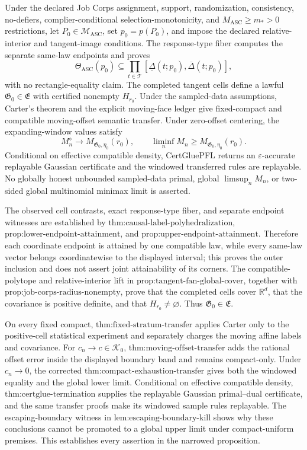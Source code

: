 Under the declared Job Corps assignment, support, randomization, consistency, no-defiers, complier-conditional selection-monotonicity, and \(M_{\mathrm{ASC}}\ge m_*>0\) restrictions, let \(P_0\in\mathcal M_{\mathrm{ASC}}\), set \(p_0=p(P_0)\), and impose the declared relative-interior and tangent-image conditions. The response-type fiber computes the separate same-law endpoints and proves
\[
 \Theta_{\mathrm{ASC}}(p_0)
 \subseteq\prod_{t\in\mathcal T}
 [\underline\Delta(t;p_0),\overline\Delta(t;p_0)],
\]
with no rectangle-equality claim. The completed tangent cells define a lawful \(\mathfrak G_0\in\mathfrak E\) with certified nonempty \(H_{r_0}\). Under the sampled-data assumptions, Carter's theorem and the explicit moving-face ledger give fixed-compact and compatible moving-offset semantic transfer. Under zero-offset centering, the expanding-window values satisfy
\[
 M_n^{\diamond}\to M_{\mathfrak G_0,\eta_0}(r_0),
 \qquad
 \liminf_nM_n\ge M_{\mathfrak G_0,\eta_0}(r_0).
\]
Conditional on effective compatible density, CertGluePFL returns an \(\varepsilon\)-accurate replayable Gaussian certificate and the windowed transferred rules are replayable. No globally honest unbounded sampled-data primal, global \(\limsup_nM_n\), or two-sided global multinomial minimax limit is asserted.

The observed cell contrasts, exact response-type fiber, and separate endpoint witnesses are established by \(\text{thm:causal-label-polyhedralization}\), \(\text{prop:lower-endpoint-attainment}\), and \(\text{prop:upper-endpoint-attainment}\). Therefore each coordinate endpoint is attained by one compatible law, while every same-law vector belongs coordinatewise to the displayed interval; this proves the outer inclusion and does not assert joint attainability of its corners. The compatible-polytope and relative-interior lift in \(\text{prop:tangent-fan-global-cover}\), together with \(\text{prop:job-corps-radius-nonempty}\), prove that the completed cells cover \(\mathbb R^d\), that the covariance is positive definite, and that \(H_{r_0}\ne\varnothing\). Thus \(\mathfrak G_0\in\mathfrak E\).

On every fixed compact, \(\text{thm:fixed-stratum-transfer}\) applies Carter only to the positive-cell statistical experiment and separately charges the moving affine labels and covariance. For \(c_n\to c\in\mathcal K_0\), \(\text{thm:moving-offset-transfer}\) adds the rational offset error inside the displayed boundary band and remains compact-only. Under \(c_n\to0\), the corrected \(\text{thm:compact-exhaustion-transfer}\) gives both the windowed equality and the global lower limit. Conditional on effective compatible density, \(\text{thm:certglue-termination}\) supplies the replayable Gaussian primal--dual certificate, and the same transfer proofs make its windowed sample rules replayable. The escaping-boundary witness in \(\text{lem:escaping-boundary-kill}\) shows why these conclusions cannot be promoted to a global upper limit under compact-uniform premises. This establishes every assertion in the narrowed proposition.

